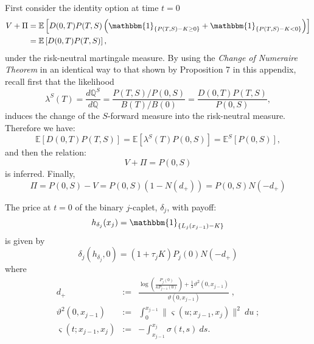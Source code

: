 \begin{demo}
First consider the identity option at time $t=0$
\begin{equation}
\nonumber
\begin{split}
V+\Pi & =\mathbb{E} \left[ D(0,T) P(T,S)\left( \mathbbm{1}_{ \{ P(T,S)-K\geq
      0\} }+\mathbbm{1}_{ \{ P(T,S)-K<0 \} } \right) \right]\\ 
& =\mathbb{E}\left[ D(0,T)P(T,S) \right],
\end{split}
\end{equation}
under the risk-neutral martingale measure. 
By using the \emph{Change of Numeraire Theorem} in an identical way to
that shown by Proposition 7 in this appendix, recall first that the
likelihood 
$$
\lambda^S(T)=\frac{d\mathbb{Q}^S}{d\mathbb{Q}}=\frac{P(T,S)/P(0,S)}{B(T)/B(0)}=\frac{D(0,T)P(T,S)}{P(0,S)},
$$
induces the change of the $S$-forward measure into the risk-neutral
measure. Therefore we have:
$$
\mathbb{E}\left[ D(0,T)P(T,S) \right]=\mathbb{E}\left[
  \lambda^S(T)P(0,S) \right]=\mathbb{E}^S\left[
  P(0,S) \right],
$$
and then the relation:
\begin{equation}
V+\Pi=P(0,S)
\end{equation}
is inferred. Finally,
\begin{equation}
\label{DigPut}
\Pi = P(0,S) - V = P(0,S) \left( 1 - N(d_+) \right) = P(0,S) N(-d_+)
\end{equation}
\end{demo}
 \begin{corol} The price at $t=0$ of the binary $j$-caplet, $\delta_j$, with
  payoff:
$$
h_{\delta_j}(x_j)=\mathbbm{1}_{ \{ L_j(x_{j-1})-K \} } 
$$
is given by
\begin{equation}
\label{GaussianForwardBinCaplet}
\delta_j(h_{\delta_j},0)=(1+\tau_j K) P_j(0) N(-d_+)
\end{equation} 
where
\begin{eqnarray}
\label{capletd+} d_{+} & := & \displaystyle \frac{\log\left(\frac{P_j(0)}{\kappa 
      P_{j-1}(0)}\right)+\frac{1}{2}\vartheta^2(0,x_{j-1})}{\vartheta(0,x_{j-1})}\;  , \\  
\label{vol1} \vartheta^2(0,x_{j-1}) & := &\displaystyle
\int_0^{x_{j-1}} \| \varsigma(u;x_{j-1},x_j) \|^2\:du\; ;\\   
\label{vol2} \varsigma(t;x_{j-1},x_j) &  := & -\displaystyle
\int_{x_{j-1}}^{x_j} \sigma(t,s)\: ds.   
\end{eqnarray}
\end{corol}

